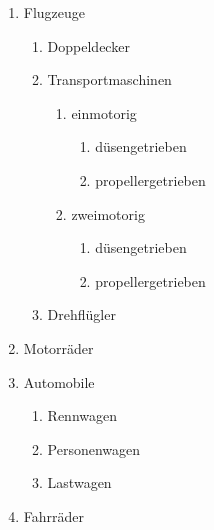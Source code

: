 \begin{enumerate}
	\item Flugzeuge
	\begin{enumerate}
		\item Doppeldecker
		\item Transportmaschinen
		\begin{enumerate}
			\item einmotorig
			\begin{enumerate}
				\item{düsengetrieben}
				\item{propellergetrieben}
			\end{enumerate}
			\item zweimotorig
			\begin{enumerate}
				\item{düsengetrieben}
				\item{propellergetrieben}
			\end{enumerate}
		\end{enumerate}
		\item Drehflügler
	\end{enumerate}
	\item Motorräder
	\item Automobile
	\begin{enumerate}
		\item Rennwagen
		\item Personenwagen
		\item Lastwagen
	\end{enumerate}
	\item Fahrräder
\end{enumerate}


